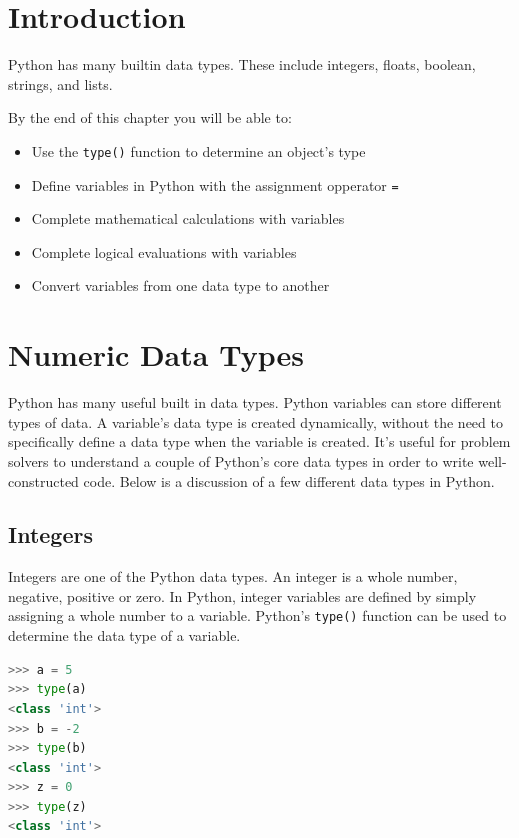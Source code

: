 \documentclass{book}
\begin{document}
    \section{Introduction}\label{introduction}

Python has many builtin data types. These include integers, floats,
boolean, strings, and lists.

By the end of this chapter you will be able to:

\begin{itemize}
\item
  Use the \lstinline!type()! function to determine an object's type
\item
  Define variables in Python with the assignment opperator \lstinline!=!
\item
  Complete mathematical calculations with variables
\item
  Complete logical evaluations with variables
\item
  Convert variables from one data type to another
\end{itemize}

    \section{Numeric Data Types}\label{numeric-data-types}

    Python has many useful built in data types. Python variables can store
different types of data. A variable's data type is created dynamically,
without the need to specifically define a data type when the variable is
created. It's useful for problem solvers to understand a couple of
Python's core data types in order to write well-constructed code. Below
is a discussion of a few different data types in Python.

    \subsection{Integers}\label{integers}

Integers are one of the Python data types. An integer is a whole number,
negative, positive or zero. In Python, integer variables are defined by
simply assigning a whole number to a variable. Python's
\lstinline!type()! function can be used to determine the data type of a
variable.

\begin{lstlisting}[language=Python]
>>> a = 5
>>> type(a)
<class 'int'>
>>> b = -2
>>> type(b)
<class 'int'>
>>> z = 0
>>> type(z)
<class 'int'>
\end{lstlisting}
\end{document}
